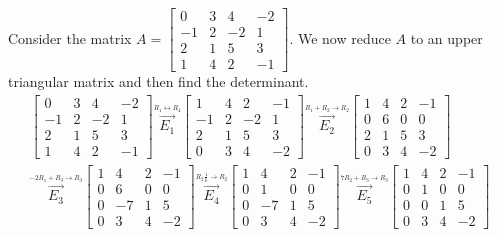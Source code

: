 \begin{example}
Consider the matrix $A=
\begin{bmatrix}
 0 & 3 & 4 & -2 \\
 -1 & 2 & -2 & 1 \\
 2 & 1 & 5 & 3 \\
 1 & 4 & 2 & -1
\end{bmatrix}$.  
We now reduce $A$ to an upper triangular matrix and then find the determinant.  
\begin{align*}
\begin{bmatrix}
 0 & 3 & 4 & -2 \\
 -1 & 2 & -2 & 1 \\
 2 & 1 & 5 & 3 \\
 1 & 4 & 2 & -1
\end{bmatrix}
\stackrel{\xrightarrow{R_1\leftrightarrow R_4}}{E_1}
\begin{bmatrix}
 1 & 4 & 2 & -1\\
 -1 & 2 & -2 & 1 \\
 2 & 1 & 5 & 3 \\
 0 & 3 & 4 & -2 
\end{bmatrix}
\stackrel{\xrightarrow{R_1+R_2\to R_2}}{E_2}
\begin{bmatrix}
 1 & 4 & 2 & -1\\
 0 & 6 & 0 & 0 \\
 2 & 1 & 5 & 3 \\
 0 & 3 & 4 & -2 
\end{bmatrix}
\\
\stackrel{\xrightarrow{-2R_1+R_3\to R_3}}{E_3}
\begin{bmatrix}
 1 & 4 & 2 & -1\\
 0 & 6 & 0 & 0 \\
 0 & -7 & 1 & 5 \\
 0 & 3 & 4 & -2 
\end{bmatrix}
\stackrel{\xrightarrow{R_2\frac{1}{6}\to R_2}}{E_4}
\begin{bmatrix}
 1 & 4 & 2 & -1\\
 0 & 1 & 0 & 0 \\
 0 & -7 & 1 & 5 \\
 0 & 3 & 4 & -2 
\end{bmatrix}
\stackrel{\xrightarrow{7R_2+R_3\to R_3}}{E_5}
\begin{bmatrix}
 1 & 4 & 2 & -1\\
 0 & 1 & 0 & 0 \\
 0 & 0 & 1 & 5 \\
 0 & 3 & 4 & -2 
\end{bmatrix}

\end{align*}
\end{example}
